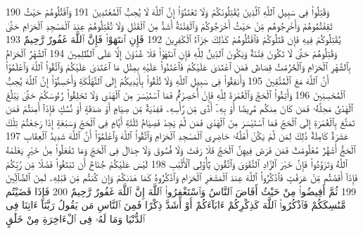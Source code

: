 {\tiny\colorbox{cl_aya}{190}} وَقَٰتِلُوا۟ فِى سَبِيلِ ٱللَّهِ ٱلَّذِينَ يُقَٰتِلُونَكُمْ وَلَا تَعْتَدُوٓا۟ إِنَّ ٱللَّهَ لَا يُحِبُّ ٱلْمُعْتَدِينَ
{\tiny\colorbox{cl_aya}{191}} وَٱقْتُلُوهُمْ حَيْثُ ثَقِفْتُمُوهُمْ وَأَخْرِجُوهُم مِّنْ حَيْثُ أَخْرَجُوكُمْ وَٱلْفِتْنَةُ أَشَدُّ مِنَ ٱلْقَتْلِ وَلَا تُقَٰتِلُوهُمْ عِندَ ٱلْمَسْجِدِ ٱلْحَرَامِ حَتَّىٰ يُقَٰتِلُوكُمْ فِيهِ فَإِن قَٰتَلُوكُمْ فَٱقْتُلُوهُمْ كَذَٰلِكَ جَزَآءُ ٱلْكَٰفِرِينَ
{\tiny\colorbox{cl_aya}{192}} فَإِنِ ٱنتَهَوْا۟ فَإِنَّ ٱللَّهَ غَفُورٌ رَّحِيمٌ
{\tiny\colorbox{cl_aya}{193}} وَقَٰتِلُوهُمْ حَتَّىٰ لَا تَكُونَ فِتْنَةٌ وَيَكُونَ ٱلدِّينُ لِلَّهِ فَإِنِ ٱنتَهَوْا۟ فَلَا عُدْوَٰنَ إِلَّا عَلَى ٱلظَّٰلِمِينَ
{\tiny\colorbox{cl_aya}{194}} ٱلشَّهْرُ ٱلْحَرَامُ بِٱلشَّهْرِ ٱلْحَرَامِ وَٱلْحُرُمَٰتُ قِصَاصٌ فَمَنِ ٱعْتَدَىٰ عَلَيْكُمْ فَٱعْتَدُوا۟ عَلَيْهِ بِمِثْلِ مَا ٱعْتَدَىٰ عَلَيْكُمْ وَٱتَّقُوا۟ ٱللَّهَ وَٱعْلَمُوٓا۟ أَنَّ ٱللَّهَ مَعَ ٱلْمُتَّقِينَ
{\tiny\colorbox{cl_aya}{195}} وَأَنفِقُوا۟ فِى سَبِيلِ ٱللَّهِ وَلَا تُلْقُوا۟ بِأَيْدِيكُمْ إِلَى ٱلتَّهْلُكَةِ وَأَحْسِنُوٓا۟ إِنَّ ٱللَّهَ يُحِبُّ ٱلْمُحْسِنِينَ
{\tiny\colorbox{cl_aya}{196}} وَأَتِمُّوا۟ ٱلْحَجَّ وَٱلْعُمْرَةَ لِلَّهِ فَإِنْ أُحْصِرْتُمْ فَمَا ٱسْتَيْسَرَ مِنَ ٱلْهَدْىِ وَلَا تَحْلِقُوا۟ رُءُوسَكُمْ حَتَّىٰ يَبْلُغَ ٱلْهَدْىُ مَحِلَّهُۥ فَمَن كَانَ مِنكُم مَّرِيضًا أَوْ بِهِۦٓ أَذًى مِّن رَّأْسِهِۦ فَفِدْيَةٌ مِّن صِيَامٍ أَوْ صَدَقَةٍ أَوْ نُسُكٍ فَإِذَآ أَمِنتُمْ فَمَن تَمَتَّعَ بِٱلْعُمْرَةِ إِلَى ٱلْحَجِّ فَمَا ٱسْتَيْسَرَ مِنَ ٱلْهَدْىِ فَمَن لَّمْ يَجِدْ فَصِيَامُ ثَلَٰثَةِ أَيَّامٍ فِى ٱلْحَجِّ وَسَبْعَةٍ إِذَا رَجَعْتُمْ تِلْكَ عَشَرَةٌ كَامِلَةٌ ذَٰلِكَ لِمَن لَّمْ يَكُنْ أَهْلُهُۥ حَاضِرِى ٱلْمَسْجِدِ ٱلْحَرَامِ وَٱتَّقُوا۟ ٱللَّهَ وَٱعْلَمُوٓا۟ أَنَّ ٱللَّهَ شَدِيدُ ٱلْعِقَابِ
{\tiny\colorbox{cl_aya}{197}} ٱلْحَجُّ أَشْهُرٌ مَّعْلُومَٰتٌ فَمَن فَرَضَ فِيهِنَّ ٱلْحَجَّ فَلَا رَفَثَ وَلَا فُسُوقَ وَلَا جِدَالَ فِى ٱلْحَجِّ وَمَا تَفْعَلُوا۟ مِنْ خَيْرٍ يَعْلَمْهُ ٱللَّهُ وَتَزَوَّدُوا۟ فَإِنَّ خَيْرَ ٱلزَّادِ ٱلتَّقْوَىٰ وَٱتَّقُونِ يَٰٓأُو۟لِى ٱلْأَلْبَٰبِ
{\tiny\colorbox{cl_aya}{198}} لَيْسَ عَلَيْكُمْ جُنَاحٌ أَن تَبْتَغُوا۟ فَضْلًا مِّن رَّبِّكُمْ فَإِذَآ أَفَضْتُم مِّنْ عَرَفَٰتٍ فَٱذْكُرُوا۟ ٱللَّهَ عِندَ ٱلْمَشْعَرِ ٱلْحَرَامِ وَٱذْكُرُوهُ كَمَا هَدَىٰكُمْ وَإِن كُنتُم مِّن قَبْلِهِۦ لَمِنَ ٱلضَّآلِّينَ
{\tiny\colorbox{cl_aya}{199}} ثُمَّ أَفِيضُوا۟ مِنْ حَيْثُ أَفَاضَ ٱلنَّاسُ وَٱسْتَغْفِرُوا۟ ٱللَّهَ إِنَّ ٱللَّهَ غَفُورٌ رَّحِيمٌ
{\tiny\colorbox{cl_aya}{200}} فَإِذَا قَضَيْتُم مَّنَٰسِكَكُمْ فَٱذْكُرُوا۟ ٱللَّهَ كَذِكْرِكُمْ ءَابَآءَكُمْ أَوْ أَشَدَّ ذِكْرًا فَمِنَ ٱلنَّاسِ مَن يَقُولُ رَبَّنَآ ءَاتِنَا فِى ٱلدُّنْيَا وَمَا لَهُۥ فِى ٱلْءَاخِرَةِ مِنْ خَلَٰقٍ
